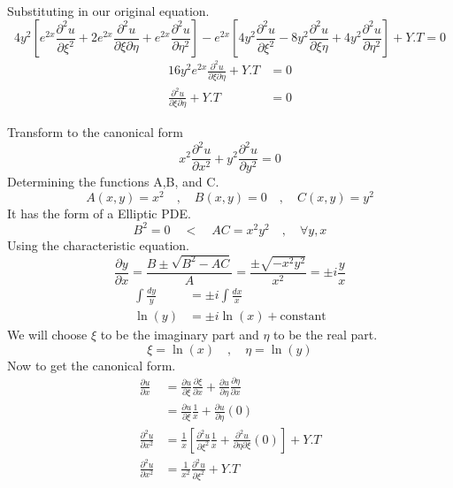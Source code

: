 \begin{example}
\begin{align*}
    \end{align*}
    Substituting in our original equation.
    \[
        4y^2\left[e^{2x}\frac{\partial^2 u}{\partial\xi^2}+2e^{2x}\frac{\partial^2 u}{\partial\xi\partial\eta}+e^{2x}\frac{\partial^2 u}{\partial\eta^2}\right]-e^{2x}\left[4y^2\frac{\partial^2 u}{\partial\xi^2}-8y^2\frac{\partial^2 u}{\partial\xi\eta}+4y^2\frac{\partial^2 u}{\partial\eta^2}\right]+Y.T = 0    
    \]
    \begin{align*}
        16y^2 e^{2x}\frac{\partial^2 u}{\partial\xi\partial\eta}+Y.T &= 0
        \\
        \frac{\partial^2 u}{\partial\xi\partial\eta} +Y.T &= 0
    \end{align*}
\end{example}
\begin{example}
    Transform to the canonical form
    \[
        x^2\frac{\partial^2 u}{\partial x^2}+y^2\frac{\partial^2 u}{\partial y^2} = 0  
    \]
    Determining the functions A,B, and C.
    \[
        A\left(x,y\right)=x^2 \quad,\quad B\left(x,y\right)=0 \quad,\quad C\left(x,y\right)=y^2    
    \]
    It has the form of a Elliptic PDE.
    \[
        B^2 =0 \quad<\quad AC=x^2 y^{2} \quad,\quad \forall y, x  
    \]
    Using the characteristic equation.
    \[
        \frac{\partial y}{\partial x} = \frac{B\pm\sqrt{B^2 -AC}}{A} = \frac{\pm\sqrt{-x^2 y^2}}{x^2}=\pm i\frac{y}{x}    
    \]
    \begin{align*}
        \int\frac{dy}{y} &= \pm i\int\frac{dx}{x}
        \\
        \ln\left(y\right) &= \pm i \ln\left(x\right)+\text{constant}
    \end{align*}
    We will choose $\xi$ to be the imaginary part and $\eta$ to be the real part.
    \[
        \xi = \ln\left(x\right) \quad , \quad \eta = \ln\left(y\right)    
    \]
    Now to get the canonical form.
    \begin{align*}
        \frac{\partial u}{\partial x} &= \frac{\partial u}{\partial\xi}\frac{\partial\xi}{\partial x} + \frac{\partial u }{\partial\eta}\frac{\partial\eta}{\partial x}
        \\
        &= \frac{\partial u}{\partial\xi}\frac{1}{x}+\frac{\partial u}{\partial\eta}\left(0\right)
        \\
        \frac{\partial^2 u}{\partial x^2} &= \frac{1}{x}\left[\frac{\partial^2 u}{\partial\xi^2}\frac{1}{x}+\frac{\partial^2 u}{\partial\eta\partial\xi}\left(0\right)\right] + Y.T
        \\
        \frac{\partial^2 u}{\partial x^2} &=\frac{1}{x^2}\frac{\partial^2 u}{\partial\xi^2}+Y.T

\end{align*}
\end{example}
